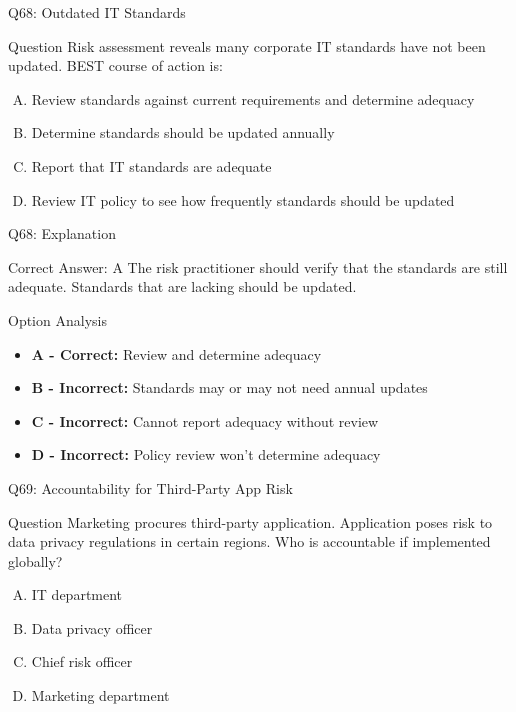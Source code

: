 \documentclass{beamer}
\begin{document}
	\begin{frame}{Q68: Outdated IT Standards}
		\begin{block}{Question}
			Risk assessment reveals many corporate IT standards have not been updated. BEST course of action is:
		\end{block}
		\begin{enumerate}[(A)]
			\item Review standards against current requirements and determine adequacy
			\item Determine standards should be updated annually
			\item Report that IT standards are adequate
			\item Review IT policy to see how frequently standards should be updated
		\end{enumerate}
	\end{frame}
	
	\begin{frame}{Q68: Explanation}
		\begin{block}{Correct Answer: A}
			The risk practitioner should verify that the standards are still adequate. Standards that are lacking should be updated.
		\end{block}
		\begin{block}{Option Analysis}
			\begin{itemize}
				\item \textbf{A - Correct:} Review and determine adequacy
				\item \textbf{B - Incorrect:} Standards may or may not need annual updates
				\item \textbf{C - Incorrect:} Cannot report adequacy without review
				\item \textbf{D - Incorrect:} Policy review won't determine adequacy
			\end{itemize}
		\end{block}
	\end{frame}
	
	\begin{frame}{Q69: Accountability for Third-Party App Risk}
		\begin{block}{Question}
			Marketing procures third-party application. Application poses risk to data privacy regulations in certain regions. Who is accountable if implemented globally?
		\end{block}
		\begin{enumerate}[(A)]
			\item IT department
			\item Data privacy officer
			\item Chief risk officer
			\item Marketing department
		\end{enumerate}
	\end{frame}
	
\end{document}
